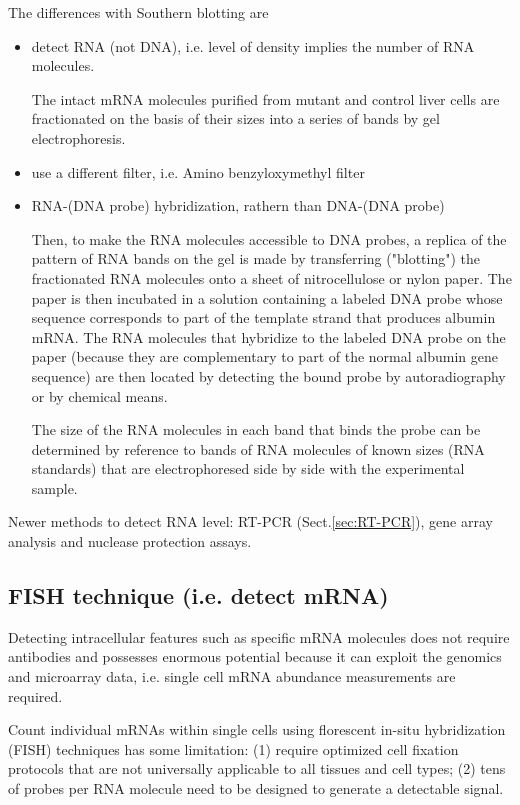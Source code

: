 The differences with Southern blotting are
\begin{itemize}
  \item detect RNA (not DNA), i.e. level of density implies the number of RNA
  molecules.

The intact mRNA molecules purified from mutant and control liver cells are
fractionated on the basis of their sizes into a series of bands by gel
electrophoresis. 

  
  \item use a different filter, i.e. Amino benzyloxymethyl filter
  
  \item RNA-(DNA probe) hybridization, rathern than DNA-(DNA probe)

Then, to make the RNA molecules accessible to DNA probes, a replica of the
pattern of RNA bands on the gel is made by transferring ("blotting") the
fractionated RNA molecules onto a sheet of nitrocellulose or nylon paper. The
paper is then incubated in a solution containing a labeled DNA probe whose
sequence corresponds to part of the template strand that produces albumin
mRNA. The RNA molecules that hybridize to the labeled DNA probe on the paper
(because they are complementary to part of the normal albumin gene sequence)
are then located by detecting the bound probe by autoradiography or by
chemical means.

The size of the RNA molecules in each band that binds the probe can be
determined by reference to bands of RNA molecules of known sizes (RNA standards)
that are electrophoresed side by side with the experimental sample.



\end{itemize}

Newer methods to detect RNA level:  RT-PCR (Sect.\ref{sec:RT-PCR}), gene array
analysis and nuclease protection assays.

\subsection{FISH technique (i.e. detect mRNA)}
\label{sec:FISH}

Detecting intracellular features such as specific mRNA molecules does not
require antibodies and possesses enormous potential because it can exploit the
genomics and microarray data, i.e.  single cell mRNA abundance measurements are
required. 

Count individual mRNAs within single cells using  florescent in-situ
hybridization (FISH) techniques has some limitation:  (1) require optimized cell
fixation protocols that are not universally applicable to all tissues and cell
types; (2)  tens of probes per RNA molecule need to be designed to generate a
detectable signal.

